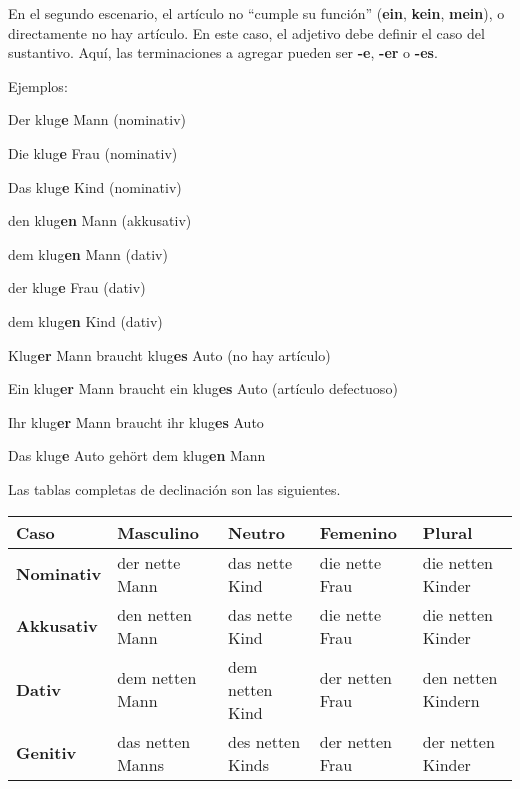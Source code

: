 En el segundo escenario, el artículo no ``cumple su función'' (\textbf{ein}, \textbf{kein}, \textbf{mein}), o directamente no hay artículo. En este caso, el adjetivo debe definir el caso del sustantivo. Aquí, las terminaciones a agregar pueden ser \textbf{-e}, \textbf{-er} o \textbf{-es}.

Ejemplos:
\begin{myitemize}
\item Der klug\textbf{e} Mann (nominativ)
\item Die klug\textbf{e} Frau (nominativ)
\item Das klug\textbf{e} Kind (nominativ)
\item den klug\textbf{en} Mann (akkusativ)
\item dem klug\textbf{en} Mann (dativ)
\item der klug\textbf{e} Frau (dativ)
\item dem klug\textbf{en} Kind (dativ)
\item Klug\textbf{er} Mann braucht klug\textbf{es} Auto (no hay artículo)
\item Ein klug\textbf{er} Mann braucht ein klug\textbf{es} Auto (artículo defectuoso)
\item Ihr klug\textbf{er} Mann braucht ihr klug\textbf{es} Auto
\item Das klug\textbf{e} Auto gehört dem klug\textbf{en} Mann
\end{myitemize}

Las tablas completas de declinación son las siguientes.


\begin{tabular}{| l | l | l | l | l |}
\hline
\textbf{Caso} & \textbf{Masculino} & \textbf{Neutro} & \textbf{Femenino} & \textbf{Plural} \\
\hline
\textbf{Nominativ} & der nette Mann & das nette Kind & die nette Frau & die netten Kinder \\
\textbf{Akkusativ} & den netten Mann & das nette Kind & die nette Frau & die netten Kinder \\
\textbf{Dativ} & dem netten Mann & dem netten Kind & der netten Frau & den netten Kindern \\
\textbf{Genitiv} & das netten Manns & des netten Kinds & der netten Frau & der netten Kinder \\
\hline
\end{tabular}



